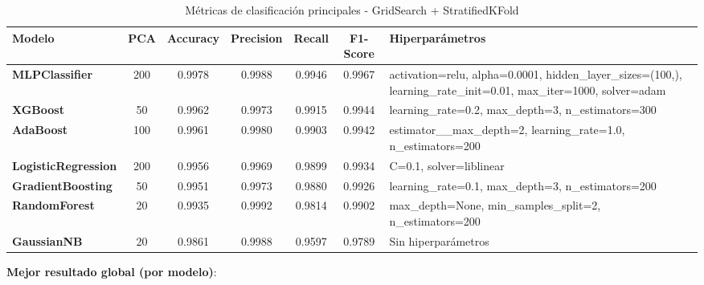 \documentclass{article}
\begin{document}
\begin{enumerate}
\begin{table}[H]
    \centering
    \begin{tabular}{|l|c|c|c|c|c|p{4cm}|}
    \hline
    \rowcolor{tableblue} \textbf{Modelo} & \textbf{PCA} & \textbf{Accuracy} & \textbf{Precision} & \textbf{Recall} & \textbf{F1-Score} & \textbf{Hiperparámetros} \\
    \hline
    \textbf{MLPClassifier} & 200 & 0.9978 & 0.9988 & 0.9946 & 0.9967 & \small{activation=relu, alpha=0.0001, hidden\_layer\_sizes=(100,), learning\_rate\_init=0.01, max\_iter=1000, solver=adam} \\
    \hline
    \textbf{XGBoost} & 50 & 0.9962 & 0.9973 & 0.9915 & 0.9944 & \small{learning\_rate=0.2, max\_depth=3, n\_estimators=300} \\
    \hline
    \textbf{AdaBoost} & 100 & 0.9961 & 0.9980 & 0.9903 & 0.9942 & \small{estimator\_\_max\_depth=2, learning\_rate=1.0, n\_estimators=200} \\
    \hline
    \textbf{LogisticRegression} & 200 & 0.9956 & 0.9969 & 0.9899 & 0.9934 & \small{C=0.1, solver=liblinear} \\
    \hline
    \textbf{GradientBoosting} & 50 & 0.9951 & 0.9973 & 0.9880 & 0.9926 & \small{learning\_rate=0.1, max\_depth=3, n\_estimators=200} \\
    \hline
    \textbf{RandomForest} & 20 & 0.9935 & 0.9992 & 0.9814 & 0.9902 & \small{max\_depth=None, min\_samples\_split=2, n\_estimators=200} \\
    \hline
    \textbf{GaussianNB} & 20 & 0.9861 & 0.9988 & 0.9597 & 0.9789 & \small{Sin hiperparámetros} \\
    \hline
    \end{tabular}
    \caption{Métricas de clasificación principales - GridSearch + StratifiedKFold}
    \label{tab:metricas_gridsearch_stratifiedkfold}
\end{table}
\end{enumerate}

\textbf{Mejor resultado global (por modelo)}:
\end{document}
